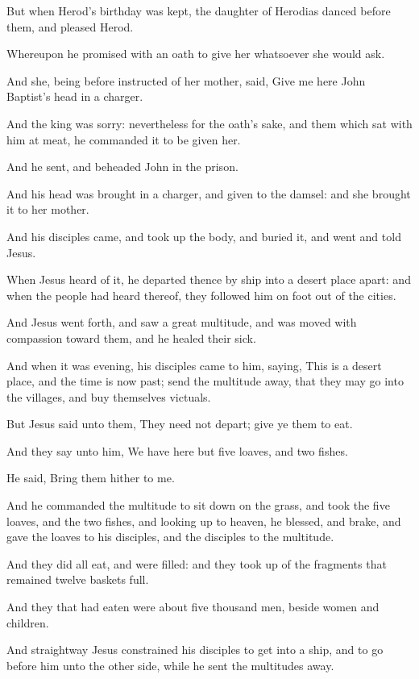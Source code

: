\Verse But when Herod's birthday was kept, the daughter of Herodias danced before them, and pleased Herod.

\Verse Whereupon he promised with an oath to give her whatsoever she would ask.

\Verse And she, being before instructed of her mother, said, Give me here John Baptist's head in a charger.

\Verse And the king was sorry: nevertheless for the oath's sake, and them which sat with him at meat, he commanded it to be given her.

\Verse And he sent, and beheaded John in the prison.

\Verse And his head was brought in a charger, and given to the damsel: and she brought it to her mother.

\Verse And his disciples came, and took up the body, and buried it, and went and told Jesus.

\Verse When Jesus heard of it, he departed thence by ship into a desert place apart: and when the people had heard thereof, they followed him on foot out of the cities.

\Verse And Jesus went forth, and saw a great multitude, and was moved with compassion toward them, and he healed their sick.

\Verse And when it was evening, his disciples came to him, saying, This is a desert place, and the time is now past; send the multitude away, that they may go into the villages, and buy themselves victuals.

\Verse But Jesus said unto them, They need not depart; give ye them to eat.

\Verse And they say unto him, We have here but five loaves, and two fishes.

\Verse He said, Bring them hither to me.

\Verse And he commanded the multitude to sit down on the grass, and took the five loaves, and the two fishes, and looking up to heaven, he blessed, and brake, and gave the loaves to his disciples, and the disciples to the multitude.

\Verse And they did all eat, and were filled: and they took up of the fragments that remained twelve baskets full.

\Verse And they that had eaten were about five thousand men, beside women and children.

\Verse And straightway Jesus constrained his disciples to get into a ship, and to go before him unto the other side, while he sent the multitudes away.

